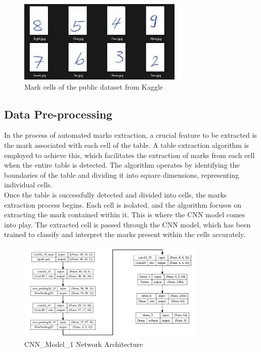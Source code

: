 \begin{figure}[htbp]
  \centering
  \includegraphics[width=0.7\textwidth]{Images/Block_Diag/Kaggle_Dataset_Header.png}
  \vspace{-15pt}
  \caption{Mark cells of the public dataset from Kaggle}
\end{figure}

\clearpage

\subsection{Data Pre-processing}

In the process of automated marks extraction, a crucial feature to be extracted is the mark associated with each cell of the table. A table extraction algorithm is employed to achieve this, which facilitates the extraction of marks from each cell when the entire table is detected. The algorithm operates by identifying the boundaries of the table and dividing it into square dimensions, representing individual cells.\\

\noindent Once the table is successfully detected and divided into cells, the marks extraction process begins. Each cell is isolated, and the algorithm focuses on extracting the mark contained within it. This is where the CNN model comes into play. The extracted cell is passed through the CNN model, which has been trained to classify and interpret the marks present within the cells accurately.\\  

\begin{figure}[h!]
    \centering
    \includegraphics[width=0.8\textwidth]{Images/Perf_Eval/NN_Architecture.png}
    \caption{CNN\_Model\_1 Network Architecture}
\end{figure}

